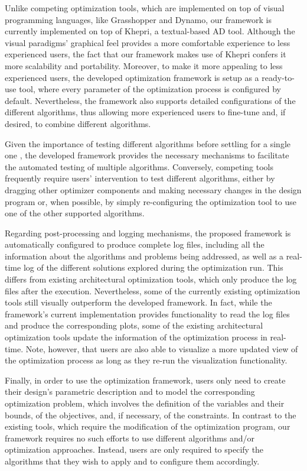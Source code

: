 Unlike competing optimization tools, which are implemented on top of visual programming languages, like Grasshopper and Dynamo, our framework is currently implemented on top of Khepri, a textual-based \ac{AD} tool. Although the visual paradigms' graphical feel provides a more comfortable experience to less experienced users, the fact that our framework makes use of Khepri confers it more scalability and portability. %
Moreover, to make it more appealing to less experienced users, the developed optimization framework is setup as a ready-to-use tool, where every parameter of the optimization process is configured by default. Nevertheless, the framework also supports detailed configurations of the different algorithms, thus allowing more experienced users to fine-tune and, if desired, to combine different algorithms. 

Given the importance of testing different algorithms before settling for a single one \cite{Wortmann2016BBO}, the developed framework provides the necessary mechanisms to facilitate the automated testing of multiple algorithms. Conversely, competing tools frequently require users' intervention to test different algorithms, either by dragging other optimizer components and making necessary changes in the design program or, when possible, by simply re-configuring the optimization tool to use one of the other supported algorithms. 

Regarding post-processing and logging mechanisms, the proposed framework is automatically configured to produce complete log files, including all the information about the algorithms and problems being addressed, as well as a real-time log of the different solutions explored during the optimization run. This differs from existing architectural optimization tools, which only produce the log files after the execution. Nevertheless, some of the currently existing optimization tools still visually outperform the developed framework. In fact, while the framework's current implementation provides functionality to read the log files and produce the corresponding plots, some of the existing architectural optimization tools update the information of the optimization process in real-time. Note, however, that users are also able to visualize a more updated view of the optimization process as long as they re-run the visualization functionality. 

Finally, in order to use the optimization framework, users only need to create their design's parametric description and to model the corresponding optimization problem, which involves the definition of the variables and their bounds, of the objectives, and, if necessary, of the constraints. In contrast to the existing tools, which require the modification of the optimization program, our framework requires no such efforts to use different algorithms and/or optimization approaches. Instead, users are only required to specify the algorithms that they wish to apply and to configure them accordingly.

